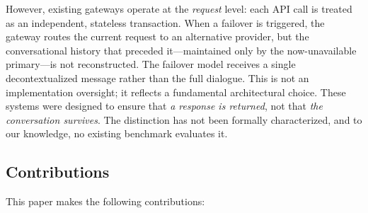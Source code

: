 However, existing gateways operate at the \textit{request} level: each API call is treated as an independent, stateless transaction. When a failover is triggered, the gateway routes the current request to an alternative provider, but the conversational history that preceded it---maintained only by the now-unavailable primary---is not reconstructed. The failover model receives a single decontextualized message rather than the full dialogue. This is not an implementation oversight; it reflects a fundamental architectural choice. These systems were designed to ensure that \textit{a response is returned}, not that \textit{the conversation survives}. The distinction has not been formally characterized, and to our knowledge, no existing benchmark evaluates it.

\subsection{Contributions}

This paper makes the following contributions:

